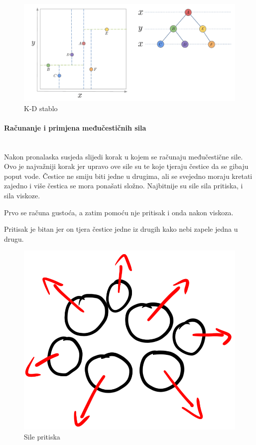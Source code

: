 \documentclass[diplomskirad]{fer}
\newcommand{\paragraphnewline}[1]{\paragraph{#1}\mbox{}\\}
\begin{document}
    \begin{figure}[H]
        \centering
        \includegraphics[scale=0.3]{images/kdtree}
        \caption{
            K-D stablo \cite{kdTree}
        }
        \label{fig:kdTree}
    \end{figure}

    \paragraphnewline{Računanje i primjena međučestičnih sila}

    Nakon pronalaska susjeda slijedi korak u kojem se računaju međučestične sile.
    Ovo je najvažniji korak jer upravo ove sile su te koje tjeraju čestice da se gibaju poput vode.
    Čestice ne smiju biti jedne u drugima, ali se svejedno moraju kretati zajedno i više čestica se mora ponašati složno.
    Najbitnije su sile sila pritiska, i sila viskoze.

    Prvo se računa gustoća, a zatim pomoću nje pritisak i onda nakon viskoza.

    Pritisak je bitan jer on tjera čestice jedne iz drugih kako nebi zapele jedna u drugu.
    \begin{figure}[H]
        \centering
        \includegraphics[scale=1]{images/pressureForce}
        \caption{
            Sile pritiska
        }
        \label{fig:pressureForce}
    \end{figure}
\end{document}
